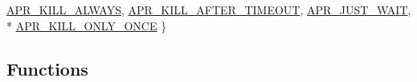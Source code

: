 \begin{DoxyCompactItemize}
\hyperlink{group__apr__thread__proc_gga3eaec78633742e7e0cb9480a21477affaf45d0f72811399b394d1311384e2dfe4}{A\-P\-R\-\_\-\-K\-I\-L\-L\-\_\-\-A\-L\-W\-A\-Y\-S}, 
\hyperlink{group__apr__thread__proc_gga3eaec78633742e7e0cb9480a21477affa16a47aa786b1c1f31ef02353bcae9a1a}{A\-P\-R\-\_\-\-K\-I\-L\-L\-\_\-\-A\-F\-T\-E\-R\-\_\-\-T\-I\-M\-E\-O\-U\-T}, 
\hyperlink{group__apr__thread__proc_gga3eaec78633742e7e0cb9480a21477affa6ada2605856ac94826edbe824e64e503}{A\-P\-R\-\_\-\-J\-U\-S\-T\-\_\-\-W\-A\-I\-T}, 
\\*
\hyperlink{group__apr__thread__proc_gga3eaec78633742e7e0cb9480a21477affa24d6f47785093be4cea2a922eeaed098}{A\-P\-R\-\_\-\-K\-I\-L\-L\-\_\-\-O\-N\-L\-Y\-\_\-\-O\-N\-C\-E}
 \}
\end{DoxyCompactItemize}
\subsection*{Functions}
